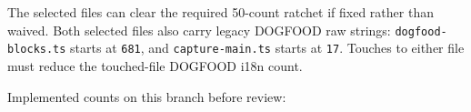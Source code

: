 The selected files can clear the required 50-count ratchet if fixed rather than waived. Both selected files also carry legacy DOGFOOD raw strings: \texttt{d\allowbreak{}o\allowbreak{}g\allowbreak{}f\allowbreak{}o\allowbreak{}o\allowbreak{}d\allowbreak{}-\allowbreak{}b\allowbreak{}l\allowbreak{}o\allowbreak{}c\allowbreak{}k\allowbreak{}s\allowbreak{}.\allowbreak{}t\allowbreak{}s} starts at \texttt{6\allowbreak{}8\allowbreak{}1}, and \texttt{c\allowbreak{}a\allowbreak{}p\allowbreak{}t\allowbreak{}u\allowbreak{}r\allowbreak{}e\allowbreak{}-\allowbreak{}m\allowbreak{}a\allowbreak{}i\allowbreak{}n\allowbreak{}.\allowbreak{}t\allowbreak{}s} starts at \texttt{1\allowbreak{}7}. Touches to either file must reduce the touched-file DOGFOOD i18n count.

Implemented counts on this branch before review:

